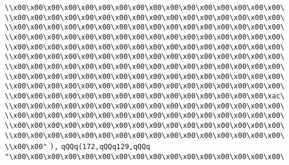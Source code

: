 \verb|\\x00\x00\x00\x00\x00\x00\x00\x00\x00\x00\x00\x00\x00\x00\x00\x00\|\newline
\verb|\\x00\x00\x00\x00\x00\x00\x00\x00\x00\x00\x00\x00\x00\x00\x00\x00\|\newline
\verb|\\x00\x00\x00\x00\x00\x00\x00\x00\x00\x00\x00\x00\x00\x00\x00\x00\|\newline
\verb|\\x00\x00\x00\x00\x00\x00\x00\x00\x00\x00\x00\x00\x00\x00\x00\x00\|\newline
\verb|\\x00\x00\x00\x00\x00\x00\x00\x00\x00\x00\x00\x00\x00\x00\x00\x00\|\newline
\verb|\\x00\x00\x00\x00\x00\x00\x00\x00\x00\x00\x00\x00\x00\x00\x00\x00\|\newline
\verb|\\x00\x00\x00\x00\x00\x00\x00\x00\x00\x00\x00\x00\x00\x00\x00\x00\|\newline
\verb|\\x00\x00\x00\x00\x00\x00\x00\x00\x00\x00\x00\x00\x00\x00\x00\x00\|\newline
\verb|\\x00\x00\x00\x00\x00\x00\x00\x00\x00\x00\x00\x00\x00\x00\x00\x00\|\newline
\verb|\\x00\x00\x00\x00\x00\x00\x00\x00\x00\x00\x00\x00\x00\x00\x00\xac\|\newline
\verb|\\x00\x00\x00\x00\x00\x00\x00\x00\x00\x00\x00\x00\x00\x00\x00\x00\|\newline
\verb|\\x00\x00\x00\x00\x00\x00\x00\x00\x00\x00\x00\x00\x00\x00\x00\x00\|\newline
\verb|\\x00\x00\x00\x00\x00\x00\x00\x00\x00\x00\x00\x00\x00\x00\x00\x00\|\newline
\verb|\\x00\x00\x00\x00\x00\x00\x00\x00\x00\x00\x00\x00\x00\x00\x00\x00\|\newline
\verb|\\x00\x00"|\newline
\verb|),|\newline
\verb|qQQq(172,qQQq129,qQQq|\newline
\verb|"\x00\x00\x00\x00\x00\x00\x00\x00\x00\x00\x00\x00\x00\x00\x00\x00\|\newline
